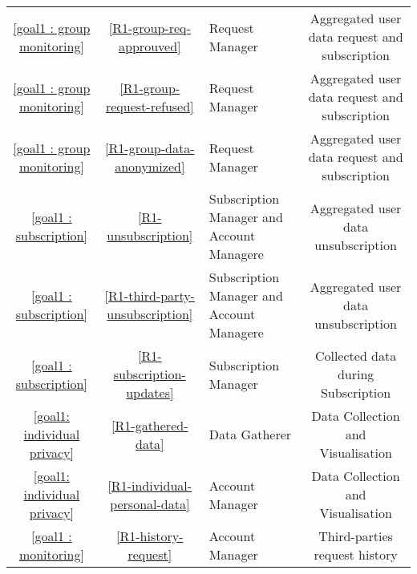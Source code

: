 \begin{table}[H]
\begin{tabular}{|c|c|p{4cm}|c|}
                    \hline
                    \ref{goal1 : group monitoring} & \ref{R1-group-req-approuved}& Request Manager & Aggregated user data request and subscription\\
                    \ref{goal1 : group monitoring} & \ref{R1-group-request-refused}& Request Manager & Aggregated user data request and subscription\\
                    \hline
                    \ref{goal1 : group monitoring} & \ref{R1-group-data-anonymized}& Request Manager & Aggregated user data request and subscription\\
                    \hline
                    \ref{goal1 : subscription} & \ref{R1-unsubscription}& Subscription Manager and Account Managere & Aggregated user data unsubscription\\
                    \hline
                    \ref{goal1 : subscription} & \ref{R1-third-party-unsubscription}& Subscription Manager and Account Managere & Aggregated user data unsubscription\\
                    \hline
                    \ref{goal1 : subscription} & \ref{R1-subscription-updates} & Subscription Manager & Collected data during Subscription \\
                     \hline
                    \ref{goal1: individual privacy} &\ref{R1-gathered-data} & Data Gatherer & Data Collection and Visualisation\\
                     \hline
                    \ref{goal1: individual privacy} &\ref{R1-individual-personal-data} & Account Manager & Data Collection and Visualisation\\
                    \hline
                    \ref{goal1 : monitoring} & \ref{R1-history-request}& Account Manager & Third-parties request history \\
                    \hline
                \end{tabular}  
            \end{table}